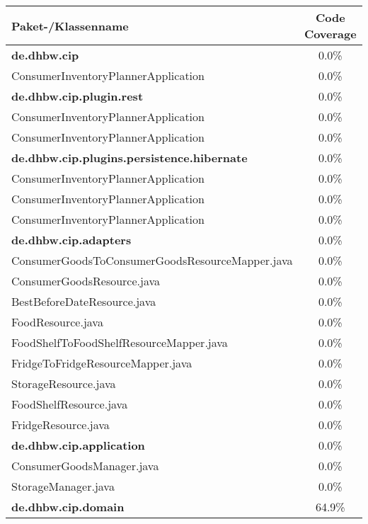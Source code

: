 \begin{table}[ht]
    \begin{tabular}{|l|c|}
        \hline
        \textbf{Paket-/Klassenname} & \textbf{Code Coverage} \\
        \hline
        \textbf{de.dhbw.cip} & 0.0\% \\
        \hline
        ConsumerInventoryPlannerApplication & 0.0\% \\
        \hline
        \textbf{de.dhbw.cip.plugin.rest} & 0.0\% \\
        \hline
        ConsumerInventoryPlannerApplication & 0.0\% \\
        \hline
        ConsumerInventoryPlannerApplication & 0.0\% \\
        \hline
        \textbf{de.dhbw.cip.plugins.persistence.hibernate} & 0.0\% \\
        \hline
        ConsumerInventoryPlannerApplication & 0.0\% \\
        \hline
        ConsumerInventoryPlannerApplication & 0.0\% \\
        \hline
        ConsumerInventoryPlannerApplication & 0.0\% \\
        \hline
        \textbf{de.dhbw.cip.adapters} & 0.0\% \\
        \hline
        ConsumerGoodsToConsumerGoodsResourceMapper.java & 0.0\% \\
        \hline
        ConsumerGoodsResource.java & 0.0\% \\
        \hline
        BestBeforeDateResource.java & 0.0\% \\
        \hline
        FoodResource.java & 0.0\% \\
        \hline
        FoodShelfToFoodShelfResourceMapper.java & 0.0\% \\
        \hline
        FridgeToFridgeResourceMapper.java & 0.0\% \\
        \hline
        StorageResource.java & 0.0\% \\
        \hline
        FoodShelfResource.java & 0.0\% \\
        \hline
        FridgeResource.java & 0.0\% \\
        \hline
        \textbf{de.dhbw.cip.application} & 0.0\% \\
        \hline
        ConsumerGoodsManager.java & 0.0\% \\
        \hline
        StorageManager.java & 0.0\% \\
        \hline
        \textbf{de.dhbw.cip.domain} & 64.9\% \\

\end{tabular}
\end{table}
